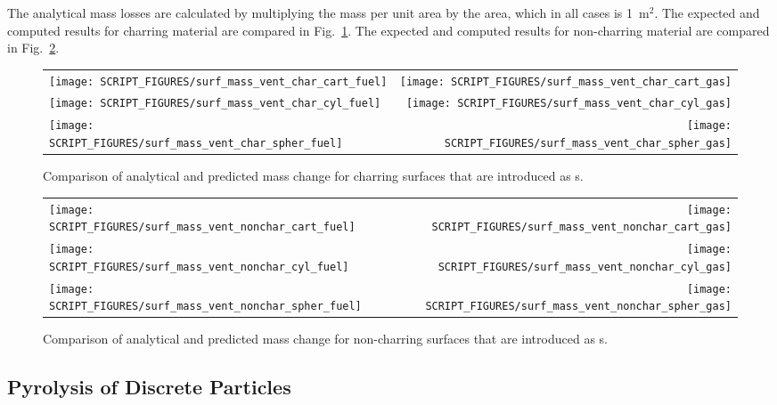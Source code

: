 \documentclass[11pt]{book}
\begin{document}
The analytical mass losses are calculated by multiplying the mass per unit area by the  area, which in all cases is 1~m$^2$. The expected and computed results for charring material are compared in Fig.~\ref{surf_mass_vent_char}. The expected and computed results for non-charring material are compared in Fig.~\ref{surf_mass_vent_nonchar}.

\begin{figure}[!htb]
\begin{tabular*}{\textwidth}{l@{\extracolsep{\fill}}r}
\texttt{[image: SCRIPT\_FIGURES/surf\_mass\_vent\_char\_cart\_fuel]} &
\texttt{[image: SCRIPT\_FIGURES/surf\_mass\_vent\_char\_cart\_gas]} \\
\texttt{[image: SCRIPT\_FIGURES/surf\_mass\_vent\_char\_cyl\_fuel]} &
\texttt{[image: SCRIPT\_FIGURES/surf\_mass\_vent\_char\_cyl\_gas]} \\
\texttt{[image: SCRIPT\_FIGURES/surf\_mass\_vent\_char\_spher\_fuel]} &
\texttt{[image: SCRIPT\_FIGURES/surf\_mass\_vent\_char\_spher\_gas]}
\end{tabular*}
\caption[The  test cases]{Comparison of analytical and predicted mass change for charring surfaces that are introduced as s.}
\label{surf_mass_vent_char}
\end{figure}

\begin{figure}[p]
\noindent
\begin{tabular*}{\textwidth}{l@{\extracolsep{\fill}}r}
\texttt{[image: SCRIPT\_FIGURES/surf\_mass\_vent\_nonchar\_cart\_fuel]} &
\texttt{[image: SCRIPT\_FIGURES/surf\_mass\_vent\_nonchar\_cart\_gas]} \\
\texttt{[image: SCRIPT\_FIGURES/surf\_mass\_vent\_nonchar\_cyl\_fuel]} &
\texttt{[image: SCRIPT\_FIGURES/surf\_mass\_vent\_nonchar\_cyl\_gas]} \\
\texttt{[image: SCRIPT\_FIGURES/surf\_mass\_vent\_nonchar\_spher\_fuel]} &
\texttt{[image: SCRIPT\_FIGURES/surf\_mass\_vent\_nonchar\_spher\_gas]}
\end{tabular*}
\caption[The  test cases]{Comparison of analytical and predicted mass change for non-charring surfaces that are introduced as s.}
\label{surf_mass_vent_nonchar}
\end{figure}

\clearpage

\subsection{Pyrolysis of Discrete Particles}
\end{document}
